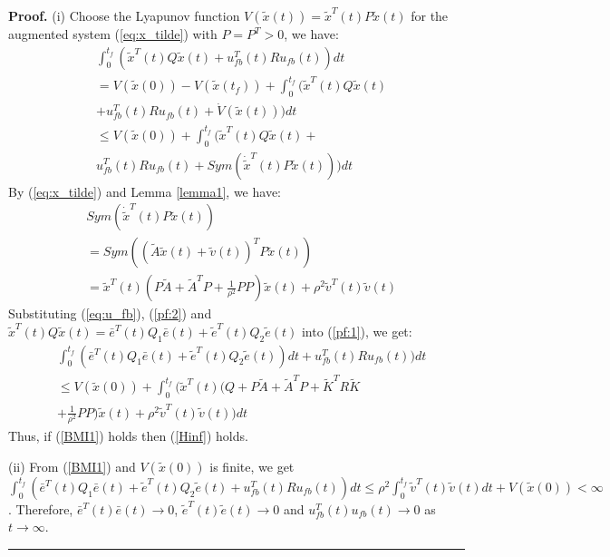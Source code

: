 \documentclass[journal,12pt,onecolumn,draftclsnofoot,]{IEEEtran}
\newenvironment{proof}[1][Proof]{\noindent\textbf{#1.} }{\ \rule{0.5em}{0.5em}}
\begin{document}
\begin{proof}
    (i) Choose the Lyapunov function $V(\tilde{x}(t))=\tilde{x}^T(t)P\tilde{x}(t)$ for the augmented system (\ref{eq:x_tilde}) with $P=P^T>0$, we have:
    \begin{equation} \label{pf:1}
        \begin{split}
            & \int_{0}^{t_f}(\tilde{x}^T(t)Q\tilde{x}(t) + u_{fb}^T(t)Ru_{fb}(t))dt \\
            & = V(\tilde{x}(0)) - V(\tilde{x}(t_f)) + \int_{0}^{t_f}(\tilde{x}^T(t)Q\tilde{x}(t) \\
            & + u_{fb}^T(t)Ru_{fb}(t) + \dot{V}(\tilde{x}(t)))dt \\
            & \leq V(\tilde{x}(0)) + \int_{0}^{t_f}(\tilde{x}^T(t)Q\tilde{x}(t) + \\
            & u_{fb}^T(t)Ru_{fb}(t) + Sym(\dot{\tilde{x}}^T(t)P\tilde{x}(t)))dt
        \end{split}
    \end{equation}
    By (\ref{eq:x_tilde}) and Lemma \ref{lemma1}, we have:
    \begin{equation} \label{pf:2}
        \begin{split}
            & Sym(\dot{\tilde{x}}^T(t)P\tilde{x}(t)) \\
            & = Sym((\tilde{A}\tilde{x}(t)+\tilde{v}(t))^TP\tilde{x}(t)) \\
            & = \tilde{x}^T(t)(P\tilde{A} + \tilde{A}^T P + \frac{1}{\rho^2}PP)\tilde{x}(t) + \rho^2\tilde{v}^T(t)\tilde{v}(t)
        \end{split}
    \end{equation}
    Substituting (\ref{eq:u_fb}), (\ref{pf:2}) and $\tilde{x}^T(t)Q\tilde{x}(t)=\bar{e}^T(t)Q_1\bar{e}(t)+\tilde{e}^T(t)Q_2\tilde{e}(t)$ into (\ref{pf:1}), we get:
    \begin{equation*} \label{pf:3}
        \begin{split}
            & \int_{0}^{t_f}(\bar{e}^T(t)Q_1\bar{e}(t)+\tilde{e}^T(t)Q_2\tilde{e}(t))dt + u_{fb}^T(t)Ru_{fb}(t))dt \\
            & \leq V(\tilde{x}(0)) + \int_{0}^{t_f}(\tilde{x}^T(t)(Q + P\tilde{A} + \tilde{A}^T P +\tilde{K}^TR\tilde{K}\\
            & + \frac{1}{\rho^2}PP)\tilde{x}(t) + \rho^2\tilde{v}^T(t)\tilde{v}(t))dt
        \end{split}
    \end{equation*}
    Thus, if (\ref{BMI1}) holds then (\ref{Hinf}) holds.

    (ii) From (\ref{BMI1}) and $V(\tilde{x}(0))$ is finite, we get $\int_{0}^{t_f}(\bar{e}^T(t)Q_1\bar{e}(t) + \tilde{e}^T(t)Q_2\tilde{e}(t) + u_{fb}^T(t)Ru_{fb}(t))dt 
    \leq \rho^2 \int_{0}^{t_f}\tilde{v}^T(t)\tilde{v}(t)dt + V(\tilde{x}(0)) 
    < \infty$. Therefore, $\bar{e}^T(t)\bar{e}(t)\rightarrow 0$, $\tilde{e}^T(t)\tilde{e}(t)\rightarrow 0$ and $u_{fb}^T(t)u_{fb}(t)\rightarrow 0$ as $t\rightarrow \infty$.
\end{proof}
\end{document}

